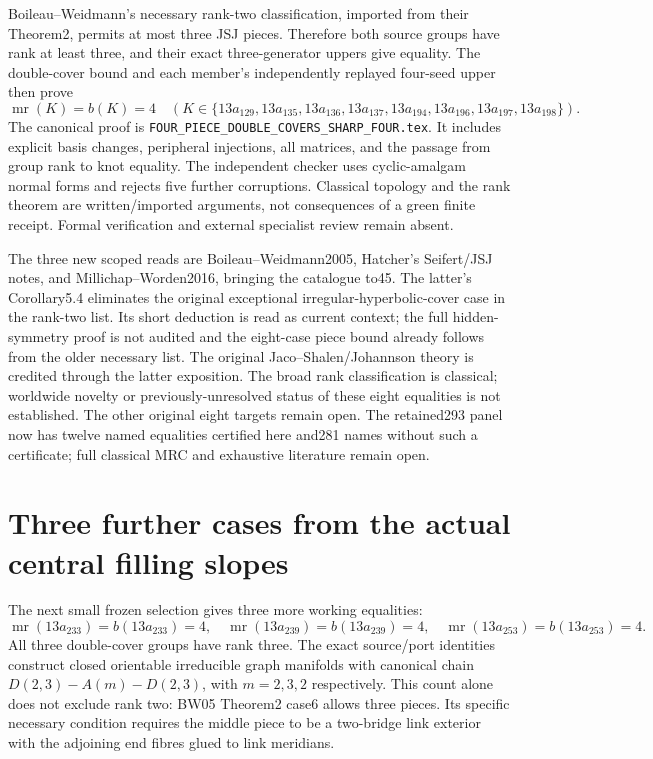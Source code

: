 \documentclass[11pt]{article}
\newcommand{\mr}{\operatorname{mr}}
\begin{document}
Boileau--Weidmann's necessary rank-two classification, imported from
their Theorem2, permits at most three JSJ pieces. Therefore both source
groups have rank at least three, and their exact three-generator uppers
give equality. The double-cover bound and each member's independently
replayed four-seed upper then prove
\[
 \mr(K)=b(K)=4\quad
 (K\in\{13a_{129},13a_{135},13a_{136},13a_{137},
        13a_{194},13a_{196},13a_{197},13a_{198}\}).
\]
The canonical proof is \texttt{FOUR\_PIECE\_DOUBLE\_COVERS\_SHARP\_FOUR.tex}.
It includes explicit basis changes, peripheral injections, all matrices,
and the passage from group rank to knot equality. The independent
checker uses cyclic-amalgam normal forms and rejects five further
corruptions. Classical topology and the rank theorem are written/imported
arguments, not consequences of a green finite receipt. Formal verification
and external specialist review remain absent.

The three new scoped reads are Boileau--Weidmann2005, Hatcher's
Seifert/JSJ notes, and Millichap--Worden2016, bringing the catalogue to45.
The latter's Corollary5.4 eliminates the original exceptional
irregular-hyperbolic-cover case in the rank-two list. Its short deduction
is read as current context; the full hidden-symmetry proof is not audited
and the eight-case piece bound already follows from the older necessary
list. The original
Jaco--Shalen/Johannson theory is credited through the latter exposition.
The broad rank classification is classical; worldwide novelty or
previously-unresolved status of these eight equalities is not established.
The other original eight targets remain open. The retained293 panel now
has twelve named equalities certified here and281 names without such a
certificate; full classical MRC and exhaustive literature remain open.

\clearpage
\section{Three further cases from the actual central filling slopes}

The next small frozen selection gives three more working equalities:
\[
 \mr(13a_{233})=b(13a_{233})=4,\quad
 \mr(13a_{239})=b(13a_{239})=4,\quad
 \mr(13a_{253})=b(13a_{253})=4.
\]
All three double-cover groups have rank three. The exact source/port
identities construct closed orientable irreducible graph manifolds with
canonical chain $D(2,3)-A(m)-D(2,3)$, with $m=2,3,2$ respectively.
This count alone does not exclude rank two: BW05 Theorem2 case6 allows
three pieces. Its specific necessary condition requires the middle piece
to be a two-bridge link exterior with the adjoining end fibres glued to
link meridians.
\end{document}
